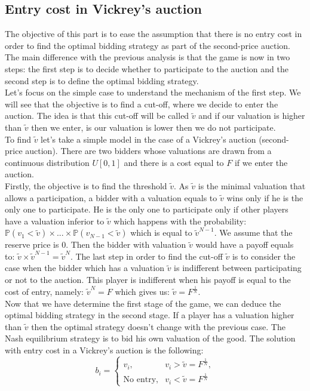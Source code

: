 \documentclass[12pt]{article}
\begin{document}
\newpage
\subsection{Entry cost in Vickrey's auction}
The objective of this part is to ease the assumption that there is no entry cost in order to find the optimal bidding strategy as part of the second-price auction. The main difference with the previous analysis is that the game is now in two steps: the first step is to decide whether to participate to the auction and the second step is to define the optimal bidding strategy. \\

Let's focus on the simple case to understand the mechanism of the first step. We will see that the objective is to find a cut-off, where we decide to enter the auction. The idea is that this cut-off will be called $\tilde{v}$ and if our valuation is higher than $\tilde{v}$ then we enter, is our valuation is lower then we do not participate. \\

To find $\tilde{v}$ let's take a simple model in the case of a Vickrey's auction (second-price auction). There are two bidders whose valuations are drawn from a continuous distribution $U[0,1]$ and there is a cost equal to $F$ if we enter the auction. \\

Firstly, the objective is to find the threshold $\tilde{v}$. As $\tilde{v}$ is the minimal valuation that allows a participation, a bidder with a valuation equals to $\tilde{v}$ wins only if he is the only one to participate. He is the only one to participate only if other players have a valuation inferior to $\tilde{v}$ which happens with the probability: $\mathbb{P}(v_1<\tilde{v})\times...\times\mathbb{P}(v_{N-1}<\tilde{v})$ which is equal to $\tilde{v}^{N-1}$. We assume that the reserve price is 0. Then the bidder with valuation $\tilde{v}$ would have a payoff equals to: $\tilde{v}\times\tilde{v}^{N-1} = \tilde{v}^N$. The last step in order to find the cut-off $\tilde{v}$ is to consider the case when the bidder which has a valuation $\tilde{v}$ is indifferent between participating or not to the auction. This player is indifferent when his payoff is equal to the cost of entry, namely: $\tilde{v}^N = F$ which gives us: $\tilde{v} = F^{\frac{1}{N}}$.\\

Now that we have determine the first stage of the game, we can deduce the optimal bidding strategy in the second stage. If a player has a valuation higher than $\tilde{v}$ then the optimal strategy doesn't change with the previous case. The Nash equilibrium strategy is to bid his own valuation of the good. The solution with entry cost in a Vickrey's auction is the following:
$$b_i = \left\{\begin{array}{lr}
v_i, & v_i>\tilde{v}=F^{\frac{1}{N}},\\
\text{No entry}, & v_i<\tilde{v}=F^{\frac{1}{N}} \end{array}\right. $$\\
\end{document}
